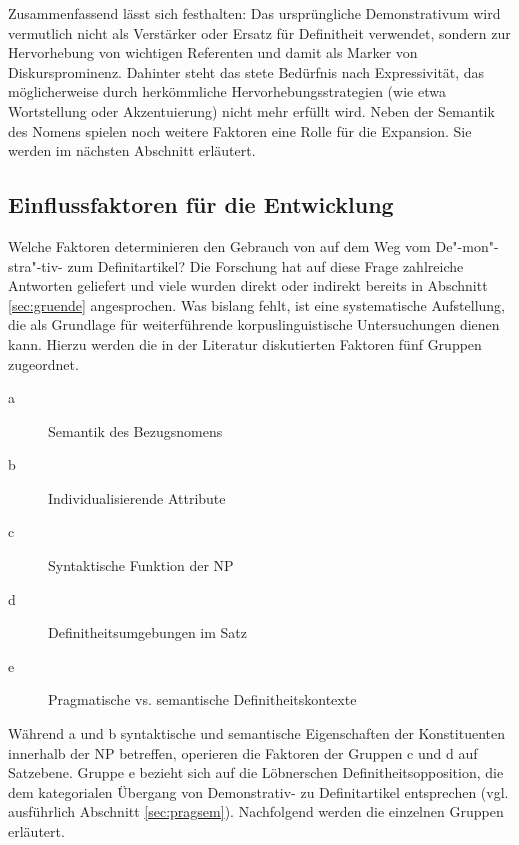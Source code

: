 Zusammenfassend lässt sich festhalten: Das ursprüngliche Demonstrativum wird vermutlich nicht als Verstärker oder Ersatz für Definitheit verwendet, sondern zur Hervorhebung von wichtigen Referenten und damit als Marker von Diskursprominenz. Dahinter steht das stete Bedürfnis nach Expressivität, das möglicherweise durch herkömmliche Hervorhebungsstrategien (wie etwa Wortstellung oder Akzentuierung) nicht mehr erfüllt wird. Neben der Semantik des Nomens spielen noch weitere Faktoren eine Rolle für die Expansion. Sie werden im nächsten Abschnitt erläutert.   

\subsection{Einflussfaktoren für die Entwicklung} \label{sec:extension}

Welche Faktoren determinieren den Gebrauch von  auf dem Weg vom De"-mon"-stra"-tiv- zum Definitartikel? Die Forschung hat auf diese Frage zahlreiche Antworten geliefert und viele wurden direkt oder indirekt bereits in Abschnitt \ref{sec:gruende} angesprochen.  Was bislang  fehlt, ist eine systematische Aufstellung, die als Grundlage für weiterführende korpuslinguistische Untersuchungen dienen kann. 
Hierzu werden die in der Literatur diskutierten Faktoren fünf Gruppen zugeordnet. 

\begin{description}
\item[a] Semantik des Bezugsnomens
\item[b] Individualisierende Attribute
\item[c] Syntaktische Funktion der NP
\item[d] Definitheitsumgebungen im Satz
\item[e] Pragmatische vs. semantische Definitheitskontexte
\end{description}
\noindent
Während a und b syntaktische und semantische Eigenschaften der Konstituenten innerhalb der NP betreffen, operieren die Faktoren der Gruppen c und d auf Satzebene. Gruppe e bezieht sich auf die Löbnerschen Definitheitsopposition, die dem kategorialen Übergang von Demonstrativ- zu Definitartikel entsprechen (vgl. ausführlich Abschnitt \ref{sec:pragsem}). Nachfolgend werden die einzelnen Gruppen erläutert.     

